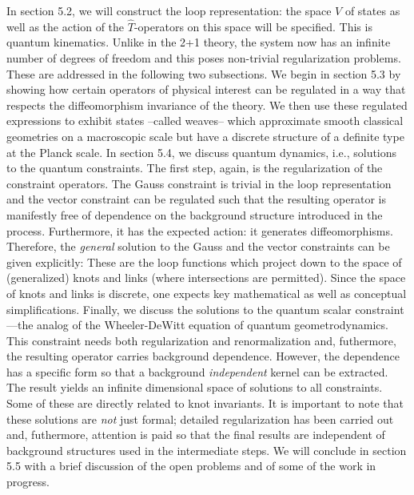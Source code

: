 In section 5.2, we will construct the loop representation: the space $V$
of states as well as the action of the $\hat{T}$-operators on this space
will be specified. This is quantum kinematics. Unlike in the 2+1 theory,
the system now has an infinite number of degrees of freedom and this poses
non-trivial regularization problems. These are addressed in the following
two subsections. We begin in section 5.3 by showing how certain operators of
physical interest can be regulated in a way that respects the diffeomorphism
invariance of the theory. We then use these regulated expressions to exhibit
states --called weaves-- which approximate smooth classical geometries
on a macroscopic scale but have a discrete structure of a definite type at the
Planck scale. In section 5.4, we discuss quantum
dynamics, i.e., solutions to the quantum constraints. The first step, again,
is the regularization of the constraint operators. The Gauss constraint is
trivial in the loop representation and the vector constraint can be regulated
such that the resulting operator is manifestly free of dependence on the
background structure introduced in the process. Furthermore, it has the
expected action: it generates diffeomorphisms. Therefore, the {\it general}
solution to the Gauss and the vector constraints can be given explicitly:
These are the loop functions which project down to the space of (generalized)
knots and links (where intersections are permitted). Since the space of knots
and links is discrete, one expects key mathematical as well as conceptual
simplifications. Finally, we discuss the solutions to the quantum scalar
constraint ---the analog of the Wheeler-DeWitt equation of quantum
geometrodynamics. This constraint needs both regularization and
renormalization and, futhermore, the resulting operator carries background
dependence. However, the dependence has a specific form so that a
background {\it independent} kernel can be extracted. The result yields an
infinite dimensional space of solutions to all constraints. Some of these are
directly related to knot invariants. It is important to note that these
solutions are {\it not} just formal; detailed regularization has been carried
out and, futhermore, attention is paid so that the final results are
independent of background structures used in the intermediate steps.
We will conclude in section 5.5 with a brief discussion of the open problems
and of some of the work in progress.

